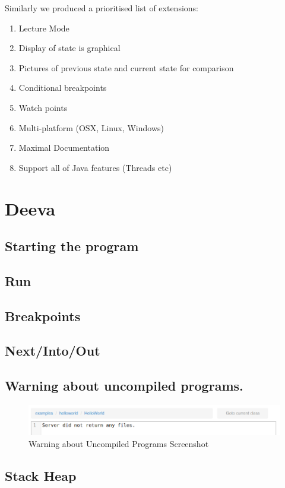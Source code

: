 \documentclass[11pt, a4paper]{article}
\begin{document}
Similarly we produced a prioritised list of extensions:

\begin{enumerate}
\item Lecture Mode
\item Display of state is graphical
\item Pictures of previous state and current state for comparison
\item Conditional breakpoints
\item Watch points
\item Multi-platform (OSX, Linux, Windows)
\item Maximal Documentation
\item Support all of Java features (Threads etc)
\end{enumerate}

\section{Deeva}
\subsection{Starting the program}
\subsection{Run}
\subsection{Breakpoints}
\subsection{Next/Into/Out}
\subsection{Warning about uncompiled programs.}
\begin{figure}[h!]
\centering
\includegraphics[scale=0.6]{warningFeature.png}
\caption{Warning about Uncompiled Programs Screenshot}
\label{fig:warningFeature}
\end{figure}

\subsection{Stack Heap}
\end{document}
